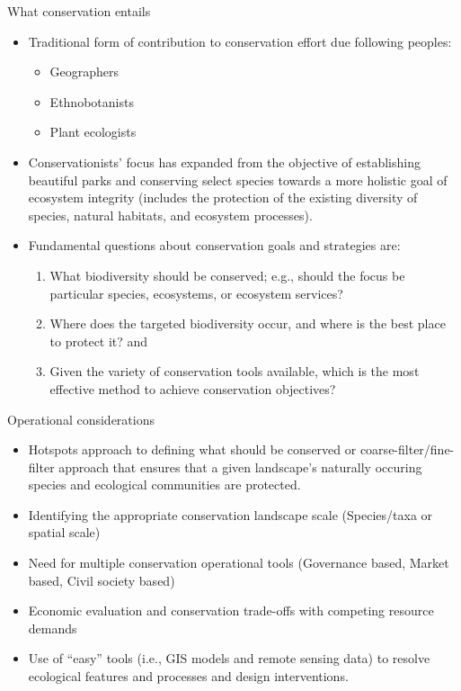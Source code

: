\documentclass[
  ignorenonframetext,
  aspectratio=169]{beamer}
\providecommand{\tightlist}{%
  \setlength{\itemsep}{0pt}\setlength{\parskip}{0pt}}
\begin{document}
\begin{frame}{What conservation entails}
\protect\hypertarget{what-conservation-entails}{}
\begin{itemize}
\tightlist
\item
  Traditional form of contribution to conservation effort due following
  peoples:

  \begin{itemize}
  \tightlist
  \item
    Geographers
  \item
    Ethnobotanists
  \item
    Plant ecologists
  \end{itemize}
\item
  Conservationists' focus has expanded from the objective of
  establishing beautiful parks and conserving select species towards a
  more holistic goal of ecosystem integrity (includes the protection of
  the existing diversity of species, natural habitats, and ecosystem
  processes).
\item
  Fundamental questions about conservation goals and strategies are:

  \begin{enumerate}
  \tightlist
  \item
    What biodiversity should be conserved; e.g., should the focus be
    particular species, ecosystems, or ecosystem services?
  \item
    Where does the targeted biodiversity occur, and where is the best
    place to protect it? and
  \item
    Given the variety of conservation tools available, which is the most
    effective method to achieve conservation objectives?
  \end{enumerate}
\end{itemize}
\end{frame}

\begin{frame}{Operational considerations}
\protect\hypertarget{operational-considerations}{}
\begin{itemize}
\tightlist
\item
  Hotspots approach to defining what should be conserved or
  coarse-filter/fine-filter approach that ensures that a given
  landscape's naturally occuring species and ecological communities are
  protected.
\item
  Identifying the appropriate conservation landscape scale (Species/taxa
  or spatial scale)
\item
  Need for multiple conservation operational tools (Governance based,
  Market based, Civil society based)
\item
  Economic evaluation and conservation trade-offs with competing
  resource demands
\item
  Use of ``easy'' tools (i.e., GIS models and remote sensing data) to
  resolve ecological features and processes and design interventions.
\end{itemize}
\end{frame}
\end{document}
